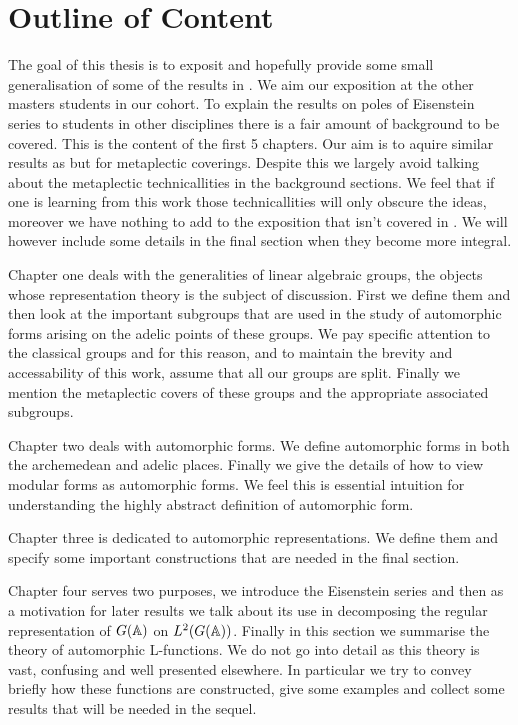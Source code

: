 \section*{Outline of Content}
The goal of this thesis is to exposit and hopefully provide some small generalisation of some of the results in \cite{jiangPolesCertainResidual2013}. We aim our exposition at the other masters students in our cohort.
To explain the results on poles of Eisenstein series to students in other disciplines there is a fair amount of background to be covered. This is the content of the first 5 chapters. Our aim is to aquire similar results as \cite{jiangPolesCertainResidual2013} but for metaplectic coverings. Despite this we largely avoid talking about the metaplectic technicallities in the background sections. We feel that if one is learning from this work those technicallities will only obscure the ideas, moreover we have nothing to add to the exposition that isn't covered in \cite{moeglinSpectralDecompositionEisenstein1995}. We will however include some details in the final section when they become more integral. 

Chapter one deals with the generalities of linear algebraic groups, the objects whose representation theory is the subject of discussion. First we define them and then look at the important subgroups that are used in the study of automorphic forms arising on the adelic points of these groups. We pay specific attention to the classical groups and for this reason, and to maintain the brevity and accessability of this work, assume that all our groups are split. Finally we mention the metaplectic covers of these groups and the appropriate associated subgroups. 

Chapter two deals with automorphic forms. We define automorphic forms in both the archemedean and adelic places. Finally we give the details of how to view modular forms as automorphic forms. We feel this is essential intuition for understanding the highly abstract definition of automorphic form. 

Chapter three is dedicated to automorphic representations. We define them and specify some important constructions that are needed in the final section.

Chapter four serves two purposes, we introduce the Eisenstein series and then as a motivation for later results we talk about its use in decomposing the regular representation of \(G(\A)\) on \(L^2(G(\A))\). Finally in this section we summarise the theory of automorphic L-functions. We do not go into detail as this theory is vast, confusing and well presented elsewhere. In particular we try to convey briefly how these functions are constructed, give some examples and collect some results that will be needed in the sequel. 

